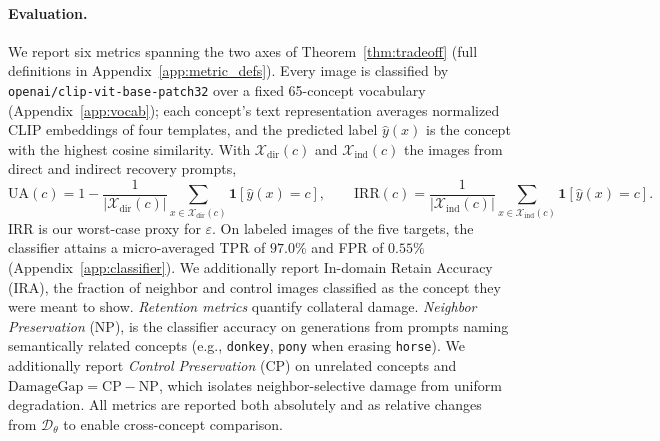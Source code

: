 \paragraph{Evaluation.} We report six metrics spanning the two axes of
Theorem~\ref{thm:tradeoff} (full definitions in Appendix~\ref{app:metric_defs}).
Every image is classified by \texttt{openai/clip-vit-base-patch32} over a fixed
65-concept vocabulary (Appendix~\ref{app:vocab}); each concept's text
representation averages normalized CLIP embeddings of four templates, and the
predicted label $\hat y(x)$ is the concept with the highest cosine similarity.
With $\mathcal{X}_{\text{dir}}(c)$ and $\mathcal{X}_{\text{ind}}(c)$ the
images from direct and indirect recovery prompts,
\begin{equation}
\mathrm{UA}(c)=1-\frac{1}{|\mathcal{X}_{\text{dir}}(c)|}\sum_{x\in\mathcal{X}_{\text{dir}}(c)}\mathbf{1}[\hat y(x)=c],
\qquad
\mathrm{IRR}(c)=\frac{1}{|\mathcal{X}_{\text{ind}}(c)|}\sum_{x\in\mathcal{X}_{\text{ind}}(c)}\mathbf{1}[\hat y(x)=c].
\end{equation}
IRR is our worst-case proxy for $\varepsilon$. On labeled images of the five
targets, the classifier attains a micro-averaged TPR of $97.0\%$ and FPR of
$0.55\%$ (Appendix~\ref{app:classifier}). We additionally report In-domain Retain Accuracy (IRA), the fraction of neighbor and control images classified as the concept they were meant to show.
\emph{Retention metrics} quantify collateral damage. 
\emph{Neighbor Preservation} (NP), is the classifier accuracy on generations from prompts naming semantically related concepts (e.g., \texttt{donkey}, \texttt{pony} when erasing \texttt{horse}). We additionally report \emph{Control Preservation} (CP) on unrelated concepts and $\mathrm{DamageGap} = \mathrm{CP} - \mathrm{NP}$, which isolates neighbor-selective damage from uniform degradation. All metrics are reported both absolutely and as relative changes from $\mathcal{D}_\theta$ to enable cross-concept comparison.


